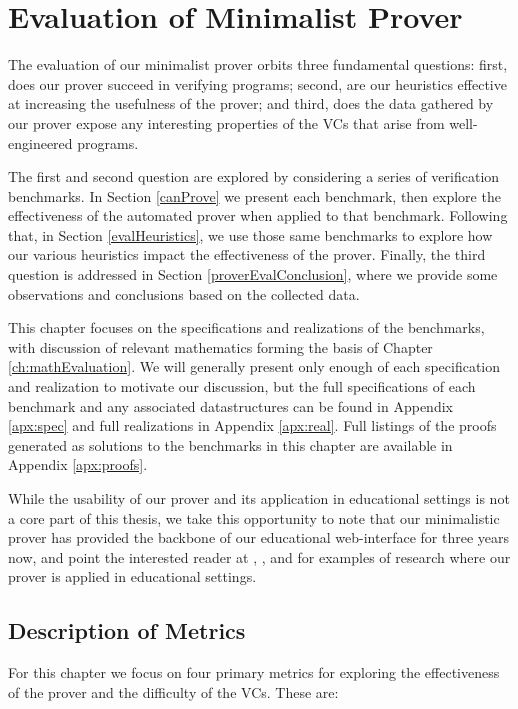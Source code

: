 


\chapter{Evaluation of Minimalist Prover\label{ch:proverEvaluation}}
The evaluation of our minimalist prover orbits three fundamental questions: first, does our prover succeed in verifying programs; second, are our heuristics effective at increasing the usefulness of the prover; and third, does the data gathered by our prover expose any interesting properties of the VCs that arise from well-engineered programs.

The first and second question are explored by considering a series of verification benchmarks.  In Section \ref{canProve} we present each benchmark, then explore the effectiveness of the automated prover when applied to that benchmark.  Following that, in Section \ref{evalHeuristics}, we use those same benchmarks to explore how our various heuristics impact the effectiveness of the prover.  Finally, the third question is addressed in Section \ref{proverEvalConclusion}, where we provide some observations and conclusions based on the collected data.

This chapter focuses on the specifications and realizations of the benchmarks, with discussion of relevant mathematics forming the basis of Chapter \ref{ch:mathEvaluation}.  We will generally present only enough of each specification and realization to motivate our discussion, but the full specifications of each benchmark and any associated datastructures can be found in Appendix \ref{apx:spec} and full realizations in Appendix \ref{apx:real}.  Full listings of the proofs generated as solutions to the benchmarks in this chapter are available in Appendix \ref{apx:proofs}.

While the usability of our prover and its application in educational settings is not a core part of this thesis, we take this opportunity to note that our minimalistic prover has provided the backbone of our educational web-interface for three years now, and point the interested reader at \cite{something}, \cite{something}, and \cite{something} for examples of research where our prover is applied in educational settings.


\section{Description of Metrics}
For this chapter we focus on four primary metrics for exploring the effectiveness of the prover and the difficulty of the VCs.  These are:

